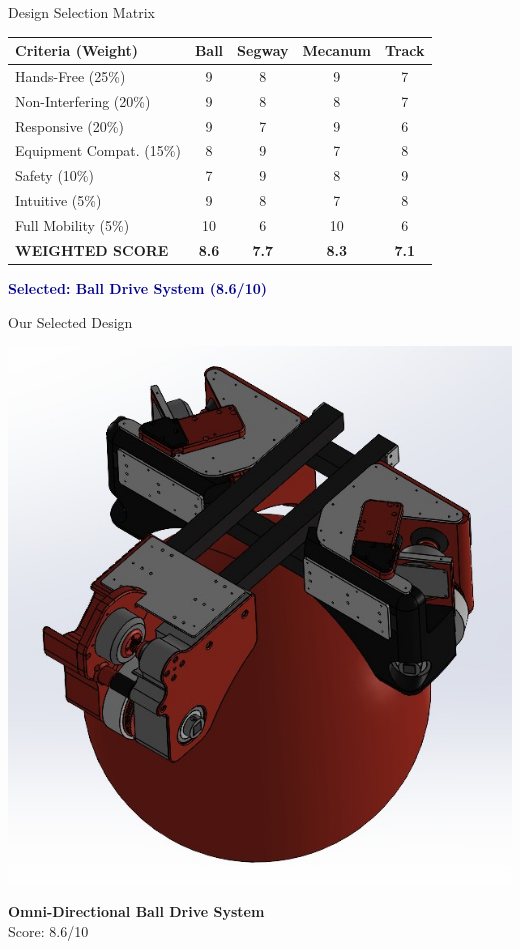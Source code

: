 \documentclass[aspectratio=169]{beamer}
\begin{document}
\begin{frame}{Design Selection Matrix}
\footnotesize
\begin{table}
\centering
\begin{tabular}{lcccc}
\toprule
\textbf{Criteria (Weight)} & \textbf{Ball} & \textbf{Segway} & \textbf{Mecanum} & \textbf{Track} \\
\midrule
Hands-Free (25\%) & 9 & 8 & 9 & 7 \\
Non-Interfering (20\%) & 9 & 8 & 8 & 7 \\
Responsive (20\%) & 9 & 7 & 9 & 6 \\
Equipment Compat. (15\%) & 8 & 9 & 7 & 8 \\
Safety (10\%) & 7 & 9 & 8 & 9 \\
Intuitive (5\%) & 9 & 8 & 7 & 8 \\
Full Mobility (5\%) & 10 & 6 & 10 & 6 \\
\midrule
\textbf{WEIGHTED SCORE} & \textbf{8.6} & \textbf{7.7} & \textbf{8.3} & \textbf{7.1} \\
\bottomrule
\end{tabular}
\end{table}

\vspace{0.3cm}
\begin{center}
\Large \textcolor{darkblue}{\textbf{Selected: Ball Drive System (8.6/10)}}
\end{center}
\end{frame}

\begin{frame}{Our Selected Design}
\begin{center}
\includegraphics[height=0.7\textheight]{pdpAssets/PreliminaryDesignCadRendering.jpg}

\Large \textbf{Omni-Directional Ball Drive System}\\
\normalsize Score: 8.6/10
\end{center}
\end{frame}
\end{document}
